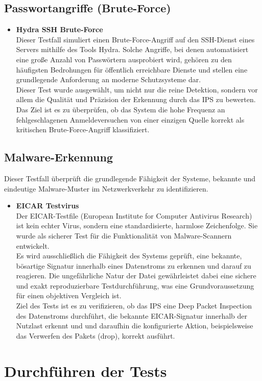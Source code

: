 \subsection{Passwortangriffe (Brute-Force)}
\begin{itemize}
\item \textbf{Hydra SSH Brute-Force}\\
Dieser Testfall simuliert einen Brute-Force-Angriff auf den SSH-Dienst eines Servers mithilfe des Tools Hydra. Solche Angriffe, bei denen automatisiert eine große Anzahl von Passwörtern ausprobiert wird, gehören zu den häufigsten Bedrohungen für öffentlich erreichbare Dienste und stellen eine grundlegende Anforderung an moderne Schutzsysteme dar.\\
Dieser Test wurde ausgewählt, um nicht nur die reine Detektion, sondern vor allem die Qualität und Präzision der Erkennung durch das IPS zu bewerten. Das Ziel ist es zu überprüfen, ob das System die hohe Frequenz an fehlgeschlagenen Anmeldeversuchen von einer einzigen Quelle korrekt als kritischen Brute-Force-Angriff klassifiziert. 
\end{itemize}

\subsection{Malware-Erkennung}

Dieser Testfall überprüft die grundlegende Fähigkeit der Systeme, bekannte und eindeutige Malware-Muster im Netzwerkverkehr zu identifizieren.
\begin{itemize}
	\item \textbf{EICAR Testvirus}\\
	Der EICAR-Testfile (European Institute for Computer Antivirus Research) ist kein echter Virus, sondern eine standardisierte, harmlose Zeichenfolge. Sie wurde als sicherer Test für die Funktionalität von Malware-Scannern entwickelt.\\
	Es wird ausschließlich die Fähigkeit des Systems geprüft, eine bekannte, bösartige Signatur innerhalb eines Datenstroms zu erkennen und darauf zu reagieren. Die ungefährliche Natur der Datei gewährleistet dabei eine sichere und exakt reproduzierbare Testdurchführung, was eine Grundvoraussetzung für einen objektiven Vergleich ist.\\
	Ziel des Tests ist es zu verifizieren, ob das IPS eine Deep Packet Inspection des Datenstroms durchführt, die bekannte EICAR-Signatur innerhalb der Nutzlast erkennt und und daraufhin die konfigurierte Aktion, beispielsweise das Verwerfen des Pakets (drop), korrekt ausführt.
\end{itemize}
\section{Durchführen der Tests}
